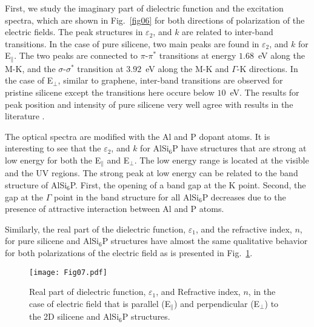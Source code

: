 \documentclass[5p,twocolumn]{elsarticle}
\def\fig#1{Fig.\ \ref{#1}}
\begin{document}
First, we study the imaginary part of dielectric function and the excitation spectra, which are shown in \fig{fig06} for both directions of polarization of the electric fields. The peak structures in $\varepsilon_2$, and $k$ are related to inter-band transitions.
In the case of pure silicene, two main peaks are found in $\varepsilon_2$, and $k$ for E$_{\parallel}$. The two peaks are connected to $\pi\text{-}\pi^{*}$ transitions at energy $1.68$~eV along the M-K, and the $\sigma\text{-}\sigma^{*}$ transition at $3.92$~eV along the M-K and $\Gamma$-K directions. In the case of E$_{\bot}$, similar
to graphene, inter-band transitions are observed for pristine silicene except the
transitions here occure below $10$~eV. The results for peak position and intensity of pure silicene very well agree with results in the literature \cite{JOHN2017307, ABDULLAH2021114644}.  

The optical spectra are modified with the Al and P dopant atoms.  
It is interesting to see that the $\varepsilon_2$, and $k$ for AlSi$_6$P have structures that are strong at low energy for both the E$_{\parallel}$ and E$_{\bot}$. The low energy range is located at the visible and the UV regions. 
%
The strong peak at low energy can be related to the band structure of AlSi$_6$P. First, the opening of a band gap at the K point. Second, the gap at the $\Gamma$ point in the band structure for all AlSi$_6$P decreases due to the presence of attractive interaction between Al and P atoms.


Similarly, the real part of the dielectric function, $\varepsilon_1$, and the refractive index, $n$, for pure silicene and AlSi$_6$P structures have almost the same qualitative behavior for both polarizations of the electric field as is presented in \fig{fig07}.

\begin{figure}[htb]
	\centering
	\texttt{[image: Fig07.pdf]}
	\caption{Real part of dielectric function, $\varepsilon_1$, and Refractive index, $n$, in the case of electric field that is parallel (E$_{\parallel}$) and perpendicular (E$_{\bot}$) to the 2D silicene and AlSi$_6$P structures.}
	\label{fig07}
\end{figure}
\end{document}
